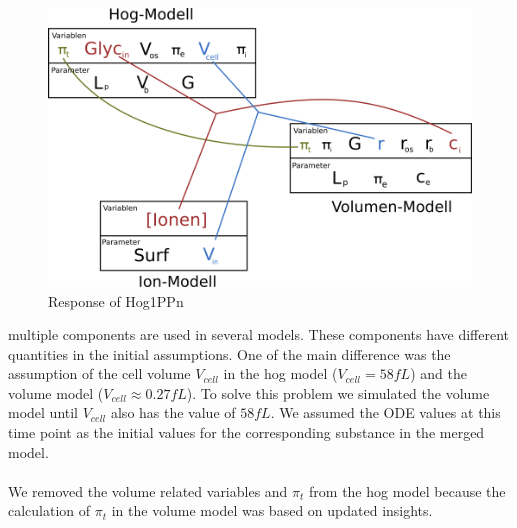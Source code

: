 \begin{figure}[h!]
	\begin{center}
		\begin{minipage}{0,8\textwidth}
			
			\includegraphics[width=\textwidth]{picture/model_intersections.png}
			\caption{Response of Hog1PPn} 
			\label{IntersectionsOfTheModels} 
		\end{minipage}
	\end{center}
\end{figure}

 multiple components are used in several models. These components have different quantities in the initial assumptions. One of the main difference was the assumption of the cell volume $V_{cell}$ in the hog model ($V_{cell}=58fL $) and the volume model ($V_{cell} \approx 0.27fL$). To solve this problem we simulated the volume model until $V_{cell}$ also has the value of $58fL$. We assumed the ODE values at this time point as the initial values for the corresponding substance in the merged model. \\\\
We removed the volume related variables and $\pi_t$ from the hog model because the calculation of $\pi_t$ in the volume model was based on updated insights.


